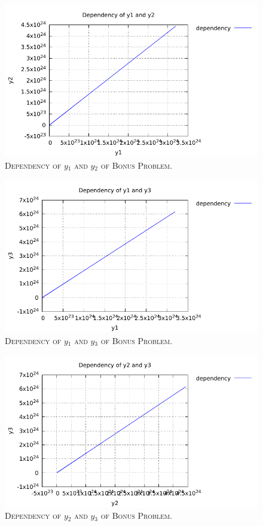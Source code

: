 \documentclass[a4paper,oneside]{book}
\numberwithin{equation}{chapter}
\begin{document}
\begin{figure}[H]
\centering
\includegraphics[scale=1.1]{f_d_1_2}
\caption{\textsc{Dependency of $y_1$ and $y_2$ of Bonus Problem.}}
\end{figure}\begin{figure}[H]
\centering
\includegraphics[scale=1.1]{f_d_1_3}
\caption{\textsc{Dependency of $y_1$ and $y_3$ of Bonus Problem.}}
\end{figure}
\begin{figure}[H]
\centering
\includegraphics[scale=1.1]{f_d_2_3}
\caption{\textsc{Dependency of $y_2$ and $y_3$ of Bonus Problem.}}
\end{figure}
\end{document}
